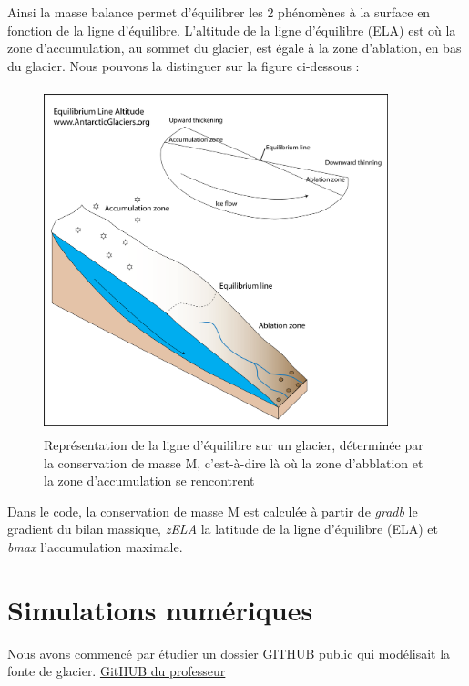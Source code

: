 \documentclass{article}
\begin{document}
Ainsi la masse balance permet d'équilibrer les 2 phénomènes à la surface en fonction de la ligne d'équilibre. L'altitude de la ligne d'équilibre (ELA) est où la zone d'accumulation, au sommet du glacier, est égale à la zone d'ablation, en bas du glacier. Nous pouvons la distinguer sur la figure ci-dessous : 
\newpage
\begin{figure}[!htpb]
\centering
\includegraphics[width=10cm, keepaspectratio=true, height=10cm]{equilibrium_line_altitude1.png}
\caption{Représentation de la ligne d'équilibre sur un glacier, déterminée par la conservation de masse M, c'est-à-dire là où la zone d'abblation et la zone d'accumulation se rencontrent}

\end{figure}



Dans le code, la conservation de masse M est calculée à partir de \textit{gradb} le gradient du bilan massique, \textit{zELA} la latitude de la ligne d'équilibre (ELA) et \textit{bmax} l'accumulation maximale.
\newpage
\section{Simulations numériques}

Nous avons commencé par étudier un dossier GITHUB public qui modélisait la fonte de glacier.
\newline
\href{https://github.com/luraess/julia-parallel-course-EGU21.git}{GitHUB du professeur}
\newline
\end{document}
